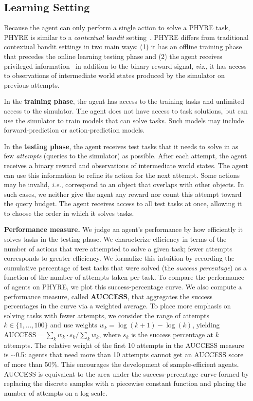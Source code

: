 \documentclass{article}
\newcommand{\app}{\raise.17ex\hbox{$\scriptstyle\sim$}}
\begin{document}
\subsection{Learning Setting}
\label{sec:learning_setting}
Because the agent can only perform a single action to solve a PHYRE task, PHYRE is similar to a \emph{contextual bandit} setting~\cite{langford2008bandits,li2010contextual}. PHYRE differs from traditional contextual bandit settings in two main ways: (1) it has an offline training phase that precedes the online learning testing phase and (2) the agent receives privileged information~\cite{vapnik2009privileged} in addition to the binary reward signal, \emph{viz.}, it has access to observations of intermediate world states produced by the simulator on previous attempts.

In the \textbf{training phase}, the agent has access to the training tasks and unlimited access to the simulator. The agent does not have access to task solutions, but can use the simulator to train models that can solve tasks. Such models may include forward-prediction or action-prediction models.

In the \textbf{testing phase}, the agent receives test tasks that it needs to solve in as few \emph{attempts} (queries to the simulator) as possible. After each attempt, the agent receives a binary reward and observations of intermediate world states. The agent can use this information to refine its action for the next attempt. Some actions may be invalid, \emph{i.e.}, correspond to an object that overlaps with other objects. In such cases, we neither give the agent any reward nor count this attempt toward the query budget. The agent receives access to all test tasks at once, allowing it to choose the order in which it solves tasks.

\noindent\textbf{Performance measure.}
We judge an agent's performance by how efficiently it solves tasks in the testing phase. We characterize efficiency in terms of the number of actions that were attempted to solve a given task; fewer attempts corresponds to greater efficiency. We formalize this intuition by recording the cumulative percentage of test tasks that were solved (the \emph{success percentage}) as a function of the number of attempts taken per task. To compare the performance of agents on PHYRE, we plot this success-percentage curve. We also compute a performance measure, called \textbf{AUCCESS}, that aggregates the success percentages in the curve via a weighted average. To place more emphasis on solving tasks with fewer attempts, we consider the range of attempts $k\!\in\!\{1, \ldots, 100\}$ and use weights $w_k \!=\! {\log(k + 1) - \log(k)}$, yielding $\textrm{AUCCESS}\!=\!\sum_k w_k \cdot s_k / \sum_k w_k$, where $s_k$ is the success percentage at $k$ attempts. The relative weight of the first 10 attempts in the AUCCESS measure is $\app$0.5: agents that need more than 10 attempts cannot get an AUCCESS score of more than 50\%. This encourages the development of sample-efficient agents. AUCCESS is equivalent to the area under the success-percentage curve formed by replacing the discrete samples with a piecewise constant function and placing the number of attempts on a log scale.
\end{document}
